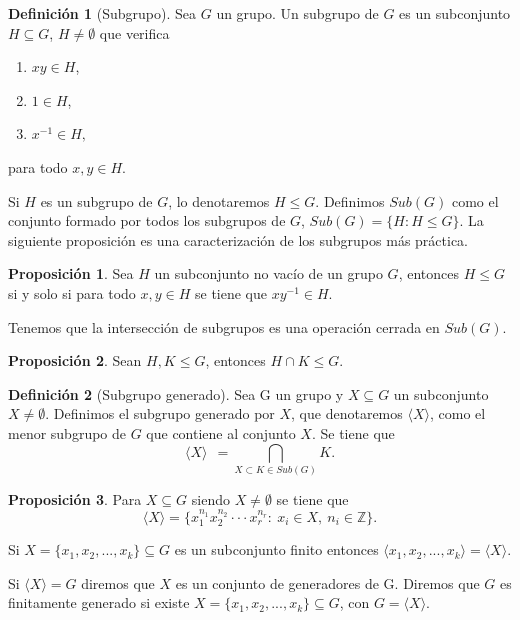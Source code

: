 \documentclass[12pt]{article}
\theoremstyle{definition}
\newtheorem{defi}{Definición}[section]
\newtheorem{prop}{Proposición}[section]
\begin{document}
\begin{defi}[Subgrupo]
Sea $G$ un grupo. Un subgrupo de $G$ es un subconjunto $H\subseteq G$, $H\neq\emptyset$ que verifica
\begin{enumerate}
\item $xy\in H$,
\item $1\in H$,
\item $x^{-1}\in H,$
\end{enumerate}
para todo $x,y\in H.$
\newline

Si $H$ es un subgrupo de $G$, lo denotaremos $H\leq G$. Definimos $Sub(G)$ como el conjunto formado por todos los subgrupos de $G$, $Sub(G)=\{H:H\leq G\}$. La siguiente proposición es una caracterización de los subgrupos más práctica.

\begin{prop}
Sea $H$ un subconjunto no vacío de un grupo $G$, entonces $H\leq G$ si y solo si para todo $x,y\in H$ se tiene que $xy^{-1}\in H$.
\end{prop}

Tenemos que la intersección de subgrupos es una operación cerrada en $Sub(G)$.
\begin{prop}
Sean $H,K\leq G$, entonces $H\cap K\leq G.$
\end{prop}



\end{defi}

\begin{defi}[Subgrupo generado]
Sea G un grupo y $X\subseteq G$ un subconjunto $X\neq\emptyset$. Definimos el subgrupo generado por $X$, que denotaremos $\langle X\rangle$, como el menor subgrupo de $G$ que contiene al conjunto $X$. Se tiene que
$$\langle X\rangle\ \ =\bigcap_{X\subset K\in Sub(G)}K.$$

\end{defi}

\begin{prop}
Para $X\subseteq G$ siendo $X\neq\emptyset$ se tiene que
$$\langle X\rangle = \{x_1^{n_1}x_2^{n_2}\cdot\cdot\cdot x_r^{n_r} :\ x_i\in X,\ n_i\in\mathbb{Z}\}.$$

\end{prop}



Si $X=\{x_1,x_2,...,x_k\}\subseteq G$ es un subconjunto finito entonces $\langle x_1,x_2,...,x_k\rangle=\langle X\rangle$.

Si $\langle X\rangle = G$ diremos que $X$ es un conjunto de generadores de G. Diremos que $G$ es finitamente generado si existe $X=\{x_1,x_2,...,x_k\}\subseteq G$, con $G=\langle X\rangle$. 
\newline
\end{document}
